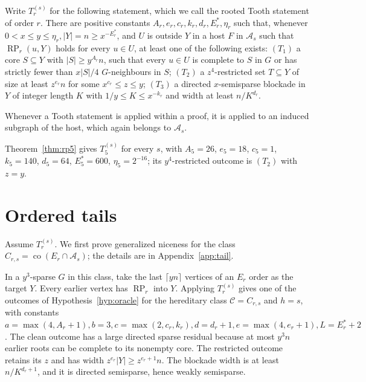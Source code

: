 \documentclass[11pt,a4paper]{article}
\theoremstyle{definition}
\theoremstyle{remark}
\numberwithin{equation}{section}
\DeclareMathOperator{\RP}{RP}
\DeclareMathOperator{\co}{co}
\begin{document}
Write \(T_{r}^{(s)}\) for the following statement, which we call the rooted Tooth statement of order \(r\). There are positive constants \(A_{r},\allowbreak e_{r},\allowbreak c_{r},\allowbreak k_{r},\allowbreak d_{r},\allowbreak E_{r}^{*},\allowbreak \eta_{r}\) such that, whenever \(0<x\le\allowbreak y\le\allowbreak \eta_{r},\allowbreak  |Y|=n\ge\allowbreak x^{-E_{r}^{*}}\), and \(U\) is outside \(Y\) in a host \(F\) in \(\mathcal{A}_{s}\) such that \(\RP_{r}(u,Y)\) holds for every \(u\in U\), at least one of the following exists: \((T_{1})\) a core \(S\subseteq Y\) with \(|S|\ge y^{A_{r}} n\), such that every \(u\in U\) is complete to \(S\) in \(G\) or has strictly fewer than \(x|S|/4\) \(G\)-neighbours in \(S\); \((T_{2})\) a \(z^{4}\)-restricted set \(T\subseteq Y\) of size at least \(z^{e_{r}} n\) for some \(x^{c_{r}}\le\allowbreak z\le\allowbreak y\); \((T_{3})\) a directed \(x\)-semisparse blockade in \(Y\) of integer length \(K\) with \(1/y\le K\le x^{-k_{r}}\) and width at least \(n/K^{d_{r}}\).

Whenever a Tooth statement is applied within a proof, it is applied to an induced subgraph of the host, which again belongs to \(\mathcal A_s\).

Theorem~\ref{thm:rp5} gives \(T_{5}^{(s)}\) for every \(s\), with \(A_{5}=26\), \(e_{5}=18\), \(c_{5}=1\), \(k_{5}=140\), \(d_{5}=64\), \(E_{5}^{*}=600\), \(\eta_{5}=2^{-16}\); its \(y^{4}\)-restricted outcome is \((T_{2})\) with \(z=y\).


\section{Ordered tails}\label{sec:tail}
Assume \(T_{r}^{(s)}\). We first prove generalized niceness for the class \(C_{r,s}=\co(E_{r}\cap\mathcal{A}_{s})\); the details are in Appendix~\ref{app:tail}.

In a \(y^{3}\)-sparse \(G\) in this class, take the last \(\lceil yn\rceil\) vertices of an \(E_{r}\) order as the target \(Y\). Every earlier vertex has \(\operatorname{RP}_{r}\) into \(Y\). Applying \(T_{r}^{(s)}\) gives one of the outcomes of Hypothesis~\ref{hyp:oracle} for the hereditary class \(\mathcal C=C_{r,s}\) and \(h=s\), with constants \(a=\max (4,\allowbreak A_{r}+1),\allowbreak  b=3,\allowbreak  c=\max (2,\allowbreak c_{r},\allowbreak k_{r}),\allowbreak  d=d_{r}+1,\allowbreak  e=\max (4,\allowbreak e_{r}+1),\allowbreak  L=E_{r}^{*}+2\). The clean outcome has a large directed sparse residual because at most \(y^{3} n\) earlier roots can be complete to its nonempty core. The restricted outcome retains its \(z\) and has width \(z^{e_{r}} |Y|\ge\allowbreak z^{e_{r}+1}n\). The blockade width is at least \(n/K^{d_{r}+1}\), and it is directed semisparse, hence weakly semisparse.
\end{document}

